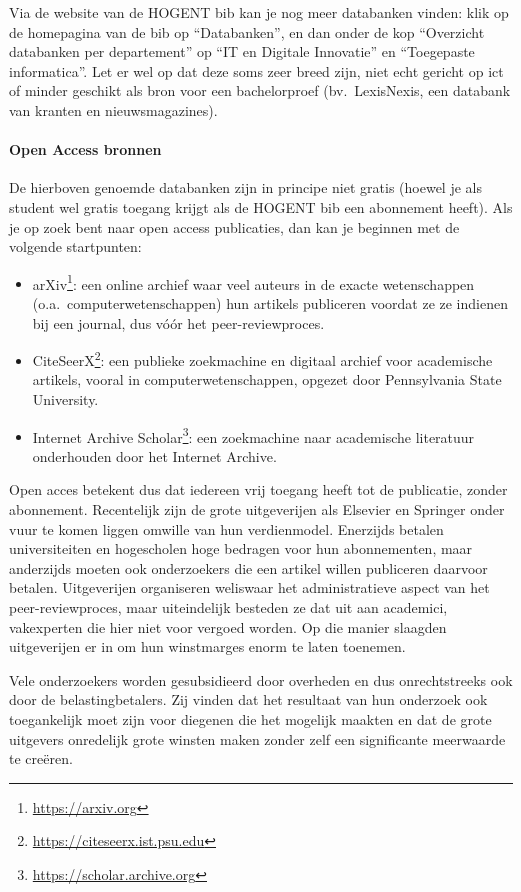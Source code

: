Via de website van de HOGENT bib kan je nog meer databanken vinden: klik op de homepagina van de bib op ``Databanken'', en dan onder de kop ``Overzicht databanken per departement'' op ``IT en Digitale Innovatie'' en ``Toegepaste informatica''. Let er wel op dat deze soms zeer breed zijn, niet echt gericht op ict of minder geschikt als bron voor een bachelorproef (bv.\ LexisNexis, een databank van kranten en nieuwsmagazines).

\paragraph{Open Access bronnen}

De hierboven genoemde databanken zijn in principe niet gratis (hoewel je als student wel gratis toegang krijgt als de HOGENT bib een abonnement heeft). Als je op zoek bent naar open access publicaties, dan kan je beginnen met de volgende startpunten:

\begin{itemize}
  \item arXiv\footnote{\url{https://arxiv.org}}: een online archief waar veel auteurs in de exacte wetenschappen (o.a.\ computerwetenschappen) hun artikels publiceren voordat ze ze indienen bij een journal, dus vóór het peer-reviewproces.
  \item CiteSeerX\footnote{\url{https://citeseerx.ist.psu.edu}}: een publieke zoekmachine en digitaal archief voor academische artikels, vooral in computerwetenschappen, opgezet door Pennsylvania State University.
  \item Internet Archive Scholar\footnote{\url{https://scholar.archive.org}}: een zoekmachine naar academische literatuur onderhouden door het Internet Archive.
\end{itemize}

Open acces betekent dus dat iedereen vrij toegang heeft tot de publicatie, zonder abonnement. Recentelijk zijn de grote uitgeverijen als Elsevier en Springer onder vuur te komen liggen omwille van hun verdienmodel. Enerzijds betalen universiteiten en hogescholen hoge bedragen voor hun abonnementen, maar anderzijds moeten ook onderzoekers die een artikel willen publiceren daarvoor betalen. Uitgeverijen organiseren weliswaar het administratieve aspect van het peer-reviewproces, maar uiteindelijk besteden ze dat uit aan academici, vakexperten die hier niet voor vergoed worden. Op die manier slaagden uitgeverijen er in om hun winstmarges enorm te laten toenemen. 

Vele onderzoekers worden gesubsidieerd door overheden en dus onrechtstreeks ook door de belastingbetalers. Zij vinden dat het resultaat van hun onderzoek ook toegankelijk moet zijn voor diegenen die het mogelijk maakten en dat de grote uitgevers onredelijk grote winsten maken zonder zelf een significante meerwaarde te creëren.

